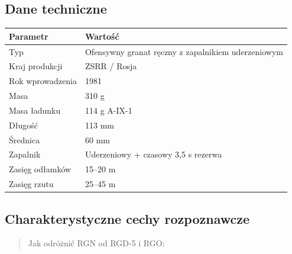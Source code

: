 \documentclass[12pt,oneside]{book}
\begin{document}
\subsection{Dane techniczne}\label{dane-techniczne-118}

\begin{longtable}[]{@{}ll@{}}
\toprule\noalign{}
Parametr & Wartość \\
\midrule\noalign{}
\endhead
\bottomrule\noalign{}
\endlastfoot
Typ & Ofensywny granat ręczny z zapalnikiem uderzeniowym \\
Kraj produkcji & ZSRR / Rosja \\
Rok wprowadzenia & 1981 \\
Masa & 310 g \\
Masa ładunku & 114 g A-IX-1 \\
Długość & 113 mm \\
Średnica & 60 mm \\
Zapalnik & Uderzeniowy + czasowy 3,5 s rezerwa \\
Zasięg odłamków & 15--20 m \\
Zasięg rzutu & 25--45 m \\
\end{longtable}

\subsection{Charakterystyczne cechy
rozpoznawcze}\label{charakterystyczne-cechy-rozpoznawcze-118}

\begin{quote}
Jak odróżnić RGN od RGD-5 i RGO:
\end{quote}
\end{document}
